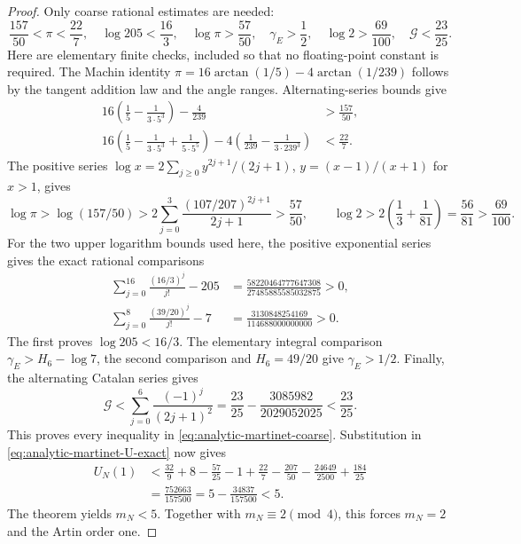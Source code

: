 \begin{proof}
Only coarse rational estimates are needed:
\begin{equation}\label{eq:analytic-martinet-coarse}
 \frac{157}{50}<\pi<\frac{22}7,\quad
 \log205<\frac{16}3,\quad \log\pi>\frac{57}{50},\quad
 \gamma_{\!E}>\frac12,\quad \log2>\frac{69}{100},\quad
 \mathcal G<\frac{23}{25}.
\end{equation}
Here are elementary finite checks, included so that no
floating-point constant is required. The Machin identity
$\pi=16\arctan(1/5)-4\arctan(1/239)$ follows by the tangent
addition law and the angle ranges. Alternating-series bounds
give
\[
 \begin{split}
 16\left(\frac15-\frac1{3\cdot5^3}\right)-\frac4{239}
                         &>\frac{157}{50},\\
 16\left(\frac15-\frac1{3\cdot5^3}
                         +\frac1{5\cdot5^5}\right)
 -4\left(\frac1{239}-\frac1{3\cdot239^3}\right)
                         &<\frac{22}7.
 \end{split}
\]
The positive series $\log x=2\sum_{j\ge0}y^{2j+1}/(2j+1)$,
$y=(x-1)/(x+1)$ for $x>1$, gives
\[
 \log\pi>\log(157/50)
       >2\sum_{j=0}^3\frac{(107/207)^{2j+1}}{2j+1}
       >\frac{57}{50},\qquad
 \log2>2\left(\frac13+\frac1{81}\right)
       =\frac{56}{81}>\frac{69}{100}.
\]
For the two upper logarithm bounds used here, the positive
exponential series gives the exact rational comparisons
\[
 \begin{split}
 \sum_{j=0}^{16}\frac{(16/3)^j}{j!}-205
       &=\frac{58220464777647308}{27485885585032875}>0,\\
 \sum_{j=0}^{8}\frac{(39/20)^j}{j!}-7
       &=\frac{3130848254169}{114688000000000}>0.
 \end{split}
\]
The first proves $\log205<16/3$. The elementary integral
comparison $\gamma_{\!E}>H_6-\log7$, the second comparison and
$H_6=49/20$ give $\gamma_{\!E}>1/2$. Finally, the alternating
Catalan series gives
\[
 \mathcal G<\sum_{j=0}^6\frac{(-1)^j}{(2j+1)^2}
       =\frac{23}{25}-\frac{3085982}{2029052025}
       <\frac{23}{25}.
\]
This proves every inequality in
\eqref{eq:analytic-martinet-coarse}. Substitution in
\eqref{eq:analytic-martinet-U-exact} now gives
\[
 \begin{split}
 U_N(1)&<\frac{32}9+8-\frac{57}{25}-1+\frac{22}7
            -\frac{207}{50}-\frac{24649}{2500}
            +\frac{184}{25}\\
       &=\frac{752663}{157500}
         =5-\frac{34837}{157500}<5.
 \end{split}
\]
The theorem yields $m_N<5$. Together with
$m_N\equiv2\pmod4$, this forces $m_N=2$ and the Artin order
one.


\end{proof}
